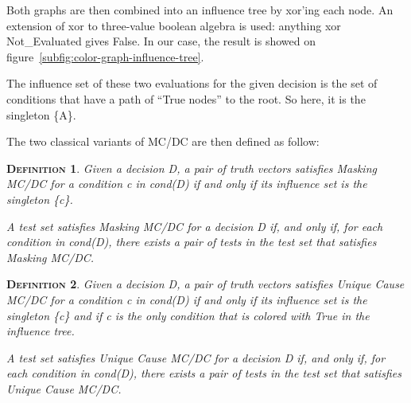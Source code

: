 \documentclass[a4paper,12pt,twoside]{article}
\newtheorem{definition}{\textsc{Definition}}
\begin{document}
Both graphs are then combined into an influence tree by xor'ing each
node. An extension of xor to three-value boolean algebra is used:
anything xor Not\_Evaluated gives False. In our case, the result is
showed on figure~\ref{subfig:color-graph-influence-tree}.

\begin{figure}[h]
  \centering
\end{figure}

The influence set of these two evaluations for the given decision is
the set of conditions that have a path of ``True nodes'' to the root.
So here, it is the singleton \{A\}.

The two classical variants of MC/DC are then defined as follow:

\begin{definition}
  \label{def:masking-mcdc}
  Given a decision D, a pair of truth vectors satisfies Masking MC/DC
  for a condition c in cond(D) if and only if its influence set is the
  singleton \{c\}.

  A test set satisfies Masking MC/DC for a decision D if, and only if,
  for each condition in cond(D), there exists a pair of tests in the
  test set that satisfies Masking MC/DC.
\end{definition}

\begin{definition}
  \label{def:unique-cause}
  Given a decision D, a pair of truth vectors satisfies Unique Cause MC/DC
  for a condition c in cond(D) if and only if its influence set is the
  singleton \{c\} and if c is the only condition that is colored with True
  in the influence tree.

  A test set satisfies Unique Cause MC/DC for a decision D if, and only if,
  for each condition in cond(D), there exists a pair of tests in the
  test set that satisfies Unique Cause MC/DC.
\end{definition}
\end{document}

